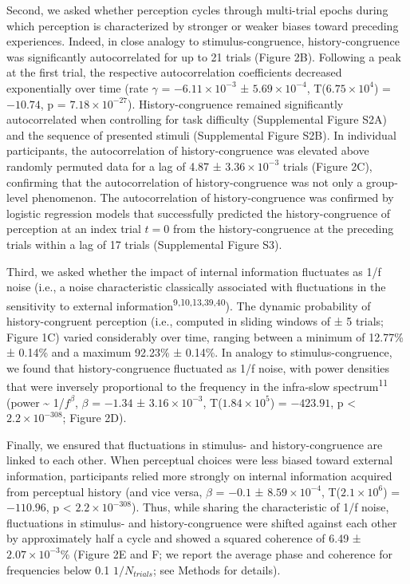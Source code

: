 \documentclass[
]{article}
\begin{document}
Second, we asked whether perception cycles through multi-trial epochs
during which perception is characterized by stronger or weaker biases
toward preceding experiences. Indeed, in close analogy to
stimulus-congruence, history-congruence was significantly autocorrelated
for up to 21 trials (Figure 2B). Following a peak at the first trial,
the respective autocorrelation coefficients decreased exponentially over
time (rate \(\gamma\) = \(\ensuremath{-6.11\times 10^{-3}}\) ±
\(\ensuremath{5.69\times 10^{-4}}\),
T(\(\ensuremath{6.75\times 10^{4}}\)) = \(-10.74\), p =
\(\ensuremath{7.18\times 10^{-27}}\)). History-congruence remained
significantly autocorrelated when controlling for task difficulty
(Supplemental Figure S2A) and the sequence of presented stimuli
(Supplemental Figure S2B). In individual participants, the
autocorrelation of history-congruence was elevated above randomly
permuted data for a lag of 4.87 ± \ensuremath{3.36\times 10^{-3}} trials
(Figure 2C), confirming that the autocorrelation of history-congruence
was not only a group-level phenomenon. The autocorrelation of
history-congruence was confirmed by logistic regression models that
successfully predicted the history-congruence of perception at an index
trial \(t = 0\) from the history-congruence at the preceding trials
within a lag of 17 trials (Supplemental Figure S3).

Third, we asked whether the impact of internal information fluctuates as
1/f noise (i.e., a noise characteristic classically associated with
fluctuations in the sensitivity to external
information\textsuperscript{9,10,13,39,40}). The dynamic probability of
history-congruent perception (i.e., computed in sliding windows of ± 5
trials; Figure 1C) varied considerably over time, ranging between a
minimum of 12.77\% ± 0.14\% and a maximum 92.23\% ± 0.14\%. In analogy
to stimulus-congruence, we found that history-congruence fluctuated as
1/f noise, with power densities that were inversely proportional to the
frequency in the infra-slow spectrum\textsuperscript{11} (power
\textasciitilde{} 1/\(f^\beta\), \(\beta\) = \(-1.34\) ±
\(\ensuremath{3.16\times 10^{-3}}\),
T(\(\ensuremath{1.84\times 10^{5}}\)) = \(-423.91\), p < \(\ensuremath{2.2\times 10^{-308}}\); Figure
2D).

Finally, we ensured that fluctuations in stimulus- and
history-congruence are linked to each other. When perceptual choices
were less biased toward external information, participants relied more
strongly on internal information acquired from perceptual history (and
vice versa, \(\beta\) = \(-0.1\) ± \(\ensuremath{8.59\times 10^{-4}}\),
T(\(\ensuremath{2.1\times 10^{6}}\)) = \(-110.96\), p < \(\ensuremath{2.2\times 10^{-308}}\)). Thus,
while sharing the characteristic of 1/f noise, fluctuations in stimulus-
and history-congruence were shifted against each other by approximately
half a cycle and showed a squared coherence of 6.49 ±
\ensuremath{2.07\times 10^{-3}}\% (Figure 2E and F; we report the
average phase and coherence for frequencies below 0.1 \(1/N_{trials}\);
see Methods for details).
\end{document}
